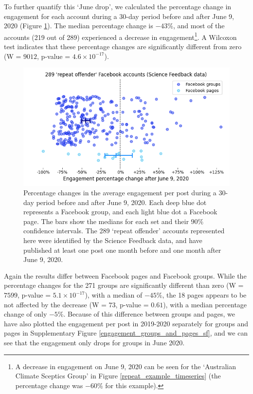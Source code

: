 \documentclass[review]{elsarticle}
\begin{document}
To further quantify this ‘June drop’, we calculated the percentage change in engagement for each account during a 30-day period before and after June 9, 2020 (Figure \ref{repeat_june_drop_percentage_change}). 
The median percentage change is $-43\%$, and most of the accounts (219 out of 289) experienced a decrease in engagement\footnote{A decrease in engagement on June 9, 2020 can be seen for the `Australian Climate Sceptics Group' in Figure \ref{repeat_example_timeseries} (the percentage change was $-60\%$ for this example).}.
A Wilcoxon test indicates that these percentage changes are significantly different from zero (W = $9012$, p-value = $4.6 \times 10^{-17}$).

\begin{figure}[!h]
\centering
\includegraphics[scale=0.5]{./../figure/sf_june_drop_percentage_change.png}
\caption{
Percentage changes in the average engagement per post during a 30-day period before and after June 9, 2020. 
Each deep blue dot represents a Facebook group, and each light blue dot a Facebook page.
The bars show the medians for each set and their $90\%$ confidence intervals.
The 289 `repeat offender' accounts represented here were identified by the Science Feedback data, and have published at least one post one month before and one month after June 9, 2020.
}
\label{repeat_june_drop_percentage_change}
\end{figure}

Again the results differ between Facebook pages and Facebook groups.
While the percentage changes for the 271 groups are significantly different than zero (W = $7599$, p-value = $5.1 \times 10^{-17}$), with a median of $-45\%$,
the 18 pages appears to be not affected by the decrease (W = $73$, p-value = $0.61$), with a median percentage change of only $-5\%$.
Because of this difference between groups and pages, we have also plotted the engagement per post in 2019-2020 separately for groups and pages in Supplementary Figure \ref{engagement_groups_and_pages_sf}, and we can see that the engagement only drops for groups in June 2020.
\end{document}
